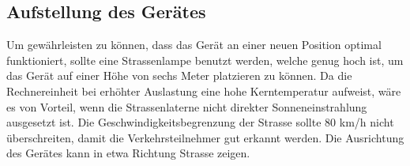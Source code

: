 \subsection{Aufstellung des Gerätes}
Um gewährleisten zu können, dass das Gerät an einer neuen Position optimal funktioniert, sollte eine Strassenlampe benutzt werden, welche genug hoch ist, um das Gerät auf einer Höhe von sechs Meter platzieren zu können. Da die Rechnereinheit bei erhöhter Auslastung eine hohe Kerntemperatur aufweist, wäre es von Vorteil, wenn die Strassenlaterne nicht direkter Sonneneinstrahlung ausgesetzt ist. Die Geschwindigkeitsbegrenzung der Strasse sollte 80 km/h nicht überschreiten, damit die Verkehrsteilnehmer gut erkannt werden. Die Ausrichtung des Gerätes kann in etwa Richtung Strasse zeigen.